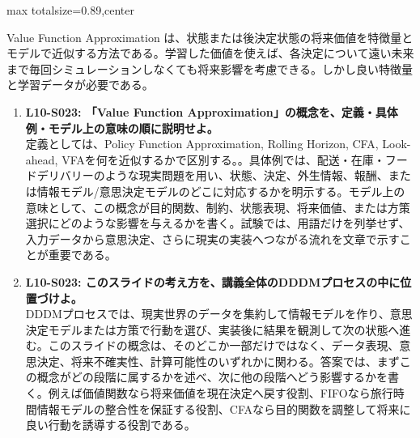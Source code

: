 \begin{minipage}[t]{0.58\textwidth}
\begin{adjustbox}{max totalsize={\textwidth}{0.89\textheight},center}
\begin{minipage}{\textwidth}
Value Function Approximation は、状態または後決定状態の将来価値を特徴量とモデルで近似する方法である。学習した価値を使えば、各決定について遠い未来まで毎回シミュレーションしなくても将来影響を考慮できる。しかし良い特徴量と学習データが必要である。\par{}\begin{enumerate}\item \textbf{L10-S023: 「Value Function Approximation」の概念を、定義・具体例・モデル上の意味の順に説明せよ。}\\定義としては、Policy Function Approximation, Rolling Horizon, CFA, Look-ahead, VFAを何を近似するかで区別する。。具体例では、配送・在庫・フードデリバリーのような現実問題を用い、状態、決定、外生情報、報酬、または情報モデル/意思決定モデルのどこに対応するかを明示する。モデル上の意味として、この概念が目的関数、制約、状態表現、将来価値、または方策選択にどのような影響を与えるかを書く。試験では、用語だけを列挙せず、入力データから意思決定、さらに現実の実装へつながる流れを文章で示すことが重要である。\item \textbf{L10-S023: このスライドの考え方を、講義全体のDDDMプロセスの中に位置づけよ。}\\DDDMプロセスでは、現実世界のデータを集約して情報モデルを作り、意思決定モデルまたは方策で行動を選び、実装後に結果を観測して次の状態へ進む。このスライドの概念は、そのどこか一部だけではなく、データ表現、意思決定、将来不確実性、計算可能性のいずれかに関わる。答案では、まずこの概念がどの段階に属するかを述べ、次に他の段階へどう影響するかを書く。例えば価値関数なら将来価値を現在決定へ戻す役割、FIFOなら旅行時間情報モデルの整合性を保証する役割、CFAなら目的関数を調整して将来に良い行動を誘導する役割である。\end{enumerate}
\end{minipage}
\end{adjustbox}
\end{minipage}


